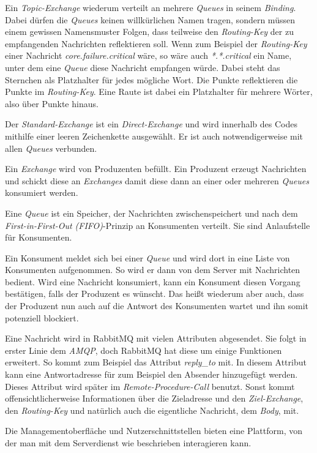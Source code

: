 \documentclass[12pt,a4paper]{scrartcl}
\begin{document}
Ein \emph{Topic-Exchange} wiederum verteilt an mehrere \emph{Queues} in seinem \emph{Binding}. Dabei dürfen die \emph{Queues} keinen willkürlichen Namen tragen, sondern müssen einem gewissen Namensmuster Folgen, dass teilweise den \emph{Routing-Key} der zu empfangenden Nachrichten reflektieren soll. Wenn zum Beispiel der \emph{Routing-Key} einer Nachricht \emph{core.failure.critical} wäre, so wäre auch \emph{*.*.critical} ein Name, unter dem eine \emph{Queue} diese Nachricht empfangen würde. Dabei steht das Sternchen als Platzhalter für jedes mögliche Wort. Die Punkte reflektieren die Punkte im \emph{Routing-Key}. Eine Raute ist dabei ein Platzhalter für mehrere Wörter, also über Punkte hinaus. 

Der \emph{Standard-Exchange} ist ein \emph{Direct-Exchange} und wird innerhalb des Codes mithilfe einer leeren Zeichenkette ausgewählt. Er ist auch notwendigerweise mit allen \emph{Queues} verbunden.

Ein \emph{Exchange} wird von Produzenten befüllt. Ein Produzent erzeugt Nachrichten und schickt diese an \emph{Exchanges} damit diese dann an einer oder mehreren \emph{Queues} konsumiert werden.

Eine \emph{Queue} ist ein Speicher, der Nachrichten zwischenspeichert und nach dem \emph{First-in-First-Out (FIFO)}-Prinzip an Konsumenten verteilt. Sie sind Anlaufstelle für Konsumenten. 

Ein Konsument meldet sich bei einer \emph{Queue} und wird dort in eine Liste von Konsumenten aufgenommen. So wird er dann von dem Server mit Nachrichten bedient. Wird eine Nachricht konsumiert, kann ein Konsument diesen Vorgang bestätigen, falls der Produzent es wünscht. Das heißt wiederum aber auch, dass der Produzent nun auch auf die Antwort des Konsumenten wartet und ihn somit potenziell blockiert.

Eine Nachricht wird in RabbitMQ mit vielen Attributen abgesendet. Sie folgt in erster Linie dem \emph{AMQP}, doch RabbitMQ hat diese um einige Funktionen erweitert. So kommt zum Beispiel das Attribut \emph{reply\_to} mit. In diesem Attribut kann eine Antwortadresse für zum Beispiel den Absender hinzugefügt werden. Dieses Attribut wird später im \emph{Remote-Procedure-Call} benutzt. Sonst kommt offensichtlicherweise Informationen über die Zieladresse und den \emph{Ziel-Exchange}, den \emph{Routing-Key} und natürlich auch die eigentliche Nachricht, dem \emph{Body}, mit.

Die Managementoberfläche und Nutzerschnittstellen bieten eine Plattform, von der man mit dem Serverdienst wie beschrieben interagieren kann.
\end{document}
